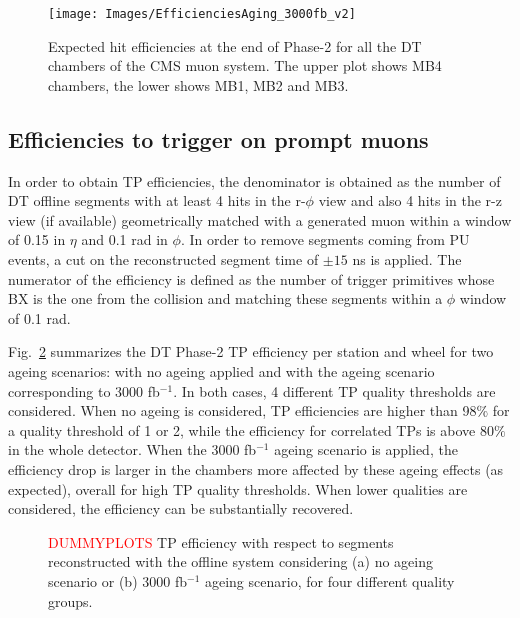 \documentclass[../main.tex]{subfiles}
\begin{document}
\begin{figure}[h!]
\begin{center}
\texttt{[image: Images/EfficienciesAging\_3000fb\_v2]}
\end{center}
\caption{Expected hit efficiencies at the end of Phase-2 for all the DT chambers of the CMS muon system. The upper plot shows MB4 chambers, the lower shows MB1, MB2 and MB3.}
\label{dts:fig:ageing}
\end{figure}

\subsection{Efficiencies to trigger on prompt muons}

In order to obtain TP efficiencies, the denominator is obtained as the number of DT offline segments with at least 4 hits in the r-$\phi$ view and also 4 hits in the r-z view (if available) geometrically matched with a generated muon within a window of 0.15 in $\eta$ and 0.1 rad in $\phi$. In order to remove segments coming from PU events, a cut on the reconstructed segment time of $\pm 15$ ns is applied. The numerator of the efficiency is defined as the number of trigger primitives whose BX is the one from the collision and matching these segments within a $\phi$ window of 0.1 rad.

Fig.~\ref{dts:fig:efficiency} summarizes the DT Phase-2 TP efficiency per station and wheel for two ageing scenarios: with no ageing applied and with the ageing scenario corresponding to 3000 fb${}^{-1}$. In both cases, 4 different TP quality thresholds are considered. When no ageing is considered, TP efficiencies are higher than 98$\%$ for a quality threshold of 1 or 2, while the efficiency for correlated TPs is above 80$\%$ in the whole detector. When the 3000 fb${}^{-1}$ ageing scenario is applied, the efficiency drop is larger in the chambers more affected by these ageing effects (as expected), overall for high TP quality thresholds. When lower qualities are considered, the efficiency can be substantially recovered.


\begin{figure}[h!]

\begin{center}
\end{center}
\caption{\textcolor{red}{DUMMYPLOTS} TP efficiency with respect to segments reconstructed with the offline system considering (a) no ageing scenario or (b) 3000 fb${}^{-1}$ ageing scenario, for four different quality groups.}
\label{dts:fig:efficiency}
\end{figure}
\end{document}
